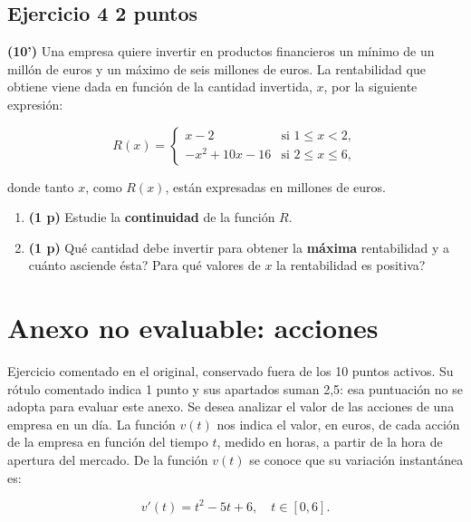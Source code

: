 \documentclass[11pt]{article}
\begin{document}
\subsection*{Ejercicio 4 \hfill 2 puntos} \textbf{(10')} Una empresa quiere invertir en productos financieros un mínimo de un millón de euros y un máximo de seis millones de euros. La rentabilidad que obtiene viene dada en función de la cantidad invertida, \( x \), por la siguiente expresión:

\[
R(x) =
\begin{cases}
x - 2 & \text{si } 1 \leq x < 2, \\
-x^2 + 10x - 16 & \text{si } 2 \leq x \leq 6,
\end{cases}
\]

donde tanto \( x \), como \( R(x) \), están expresadas en millones de euros.

\begin{enumerate}
    \item[\textbf{a)}] \textbf{(1 p)} Estudie la \textbf{continuidad} de la función \( R \).
    \item[\textbf{b)}] \textbf{(1 p)} \textquestiondown{}Qué cantidad debe invertir para obtener la \textbf{máxima} rentabilidad y a cuánto asciende ésta? \textquestiondown{}Para qué valores de \( x \) la rentabilidad es positiva?
\end{enumerate}
















\clearpage\section*{Anexo no evaluable: acciones}
Ejercicio comentado en el original, conservado fuera de los 10 puntos activos. Su rótulo comentado indica 1 punto y sus apartados suman 2,5: esa puntuación no se adopta para evaluar este anexo.
Se desea analizar el valor de las acciones de una empresa en un día. La función \(v(t)\) nos indica el valor, en euros, de cada acción de la empresa en función del tiempo \(t\), medido en horas, a partir de la hora de apertura del mercado. De la función \(v(t)\) se conoce que su variación instantánea es:

\[
v'(t) = t^2 - 5t + 6, \quad t \in [0, 6].
\]
\end{document}
